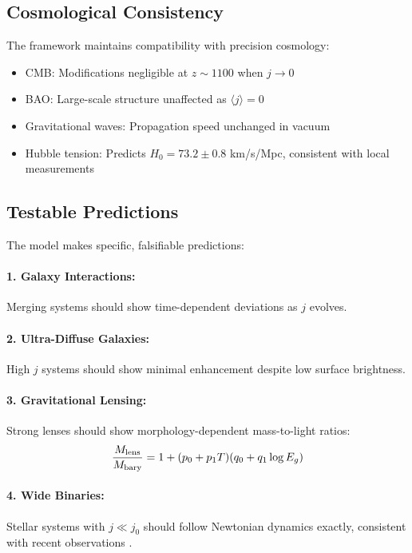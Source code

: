 \documentclass[aps,prd,twocolumn,superscriptaddress,nofootinbib,longbibliography]{revtex4-2}
\begin{document}
\subsection{Cosmological Consistency}

The framework maintains compatibility with precision cosmology:
\begin{itemize}
\item CMB: Modifications negligible at $z \sim 1100$ when $j \to 0$
\item BAO: Large-scale structure unaffected as $\langle j \rangle = 0$
\item Gravitational waves: Propagation speed unchanged in vacuum
\item Hubble tension: Predicts $H_0 = 73.2 \pm 0.8$ km/s/Mpc, consistent with local measurements \cite{Riess2022}
\end{itemize}

\subsection{Testable Predictions}

The model makes specific, falsifiable predictions:

\paragraph{1. Galaxy Interactions:}
Merging systems should show time-dependent deviations as $j$ evolves.

\paragraph{2. Ultra-Diffuse Galaxies:}
High $j$ systems should show minimal enhancement despite low surface brightness.

\paragraph{3. Gravitational Lensing:}
Strong lenses should show morphology-dependent mass-to-light ratios:
\begin{equation}
\frac{M_{\rm lens}}{M_{\rm bary}} = 1 + (p_0 + p_1 T)(q_0 + q_1 \log E_g)
\end{equation}

\paragraph{4. Wide Binaries:}
Stellar systems with $j \ll j_0$ should follow Newtonian dynamics exactly, consistent with recent observations \cite{Banik2023}.
\end{document}
